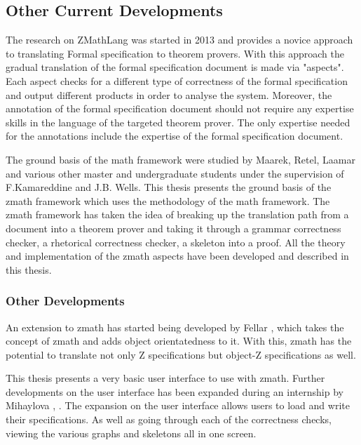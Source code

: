 \subsection{Other Current Developments}
\label{subsec:currendevelopments}

The research on ZMathLang was started in 2013 and provides a novice approach to
translating Formal specification to theorem provers. With this approach the
gradual translation of the formal specification document is made via "aspects".
Each aspect checks for a different type of correctness of the formal
specification and output different products in order to analyse the system.
Moreover, the annotation of the formal specification document should not require
any expertise skills in the language of the targeted theorem prover. The only
expertise needed for the annotations include the expertise of the formal
specification document.

The ground basis of the \gls{math} framework were studied by Maarek, Retel,
Laamar and various other master and undergraduate students under the supervision
of F.Kamareddine and J.B. Wells. This thesis presents the ground basis of the
\gls{zmath} framework which uses the methodology of the \gls{math} framework.
The \gls{zmath} framework has taken the idea of breaking up the translation path
from a document into a theorem prover and taking it through a grammar
correctness checker, a rhetorical correctness checker, a skeleton into a proof.
All the theory and implementation of the \gls{zmath} aspects have been developed
and described in this thesis.

\subsubsection{Other Developments}

An extension to \gls{zmath} has started being developed by Fellar
\cite{zmathmaster}, \cite{ozmathconference} which takes the concept of
\gls{zmath} and adds object orientatedness to it. With this, \gls{zmath} has the
potential to translate not only Z specifications but object-Z specifications as
well. 

This thesis presents a very basic user interface to use with \gls{zmath}.
Further developments on the user interface has been expanded during an
internship by Mihaylova \cite{zmathuser}, \cite{zmathinternship}. The expansion
on the user interface allows users to load and write their specifications. As
well as going through each of the correctness checks, viewing the various graphs
and skeletons all in one screen.

